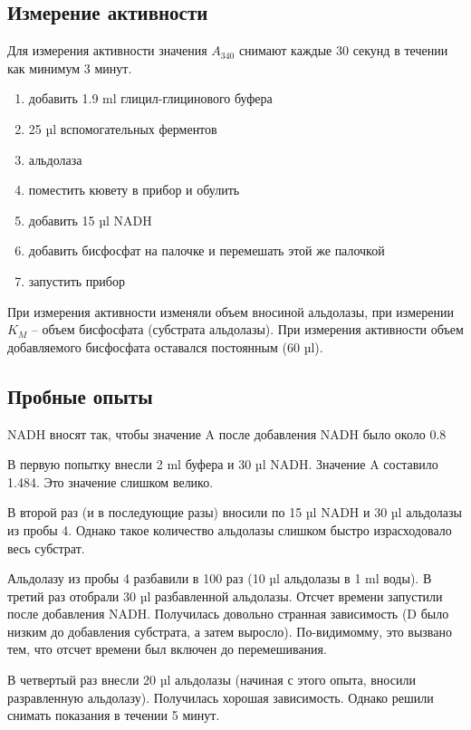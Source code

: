 \subsection{Измерение активности}
\label{activeness}
Для измерения активности значения $A_{340}$ снимают каждые 30 секунд
в течении как минимум 3 минут.
\begin{enumerate}
\item добавить 1.9 ml глицил-глицинового буфера
\item 25 µl вспомогательных ферментов
\item альдолаза
\item поместить кювету в прибор и обулить
\item добавить 15 µl NADH
\item добавить бисфосфат на палочке и перемешать этой же палочкой
\item запустить прибор
\end{enumerate}

При измерения активности изменяли объем вносиной альдолазы,
при измерении $K_M$ -- объем бисфосфата (субстрата альдолазы).
При измерения активности объем добавляемого
бисфосфата оставался постоянным (60 µl).

\subsection{Пробные опыты}

NADH вносят так, чтобы значение A после добавления NADH
было около 0.8

В первую попытку внесли 2 ml буфера и 30 µl NADH.
Значение A составило 1.484.
Это значение слишком велико.

В второй раз (и в последующие разы) вносили по 15 µl NADH и
30 µl альдолазы из пробы 4.
Однако такое количество альдолазы слишком быстро израсходовало
весь субстрат.

Альдолазу из пробы 4 разбавили в 100 раз (10 µl альдолазы в 1 ml воды).
В третий раз отобрали 30 µl разбавленной альдолазы.
Отсчет времени запустили после добавления NADH.
Получилась довольно странная зависимость
(D было низким до добавления субстрата, а затем выросло).
По-видимомму, это вызвано тем, что отсчет времени был включен до перемешивания.

В четвертый раз внесли 20 µl альдолазы (начиная с этого опыта, вносили разравленную альдолазу).
Получилась хорошая зависимость.
Однако решили снимать показания в течении 5 минут.



